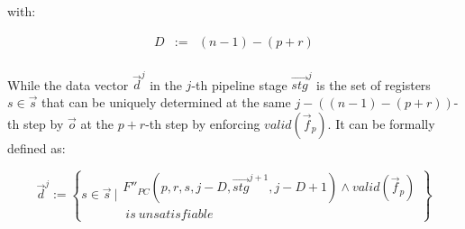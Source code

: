 \documentclass[runningheads,a4paper,orivec]{llncs}
\begin{document}
with:

\begin{equation}\label{stgn_def}
\begin{array}{ccc}
D             & := & (n-1)-(p+r)\\
\end{array}
\end{equation}

While the data vector $\vec{d}^j$ in the $j$-th pipeline stage $\vec{stg}^j$
is the set of registers $s\in \vec{s}$ 
that can be uniquely determined at the same $j-((n-1)-(p+r))$-th step 
by $\vec{o}$ at the $p+r$-th step by enforcing $valid(\vec{f}_p)$.
It can be formally defined as:

\begin{equation}\label{stgn_dj}
\vec{d}^{j} := 
 \left\{
 s\in \vec{s} ~| 
 \begin{array}{cc}
 F''_{PC}(p,r,s,j-D,\vec{stg}^{j+1},j-D+1)\wedge valid(\vec{f}_p)\\
 ~is~unsatisfiable
 \end{array}
\right\}
\end{equation}



% 
% 
% 

% 
% 
\end{document}
